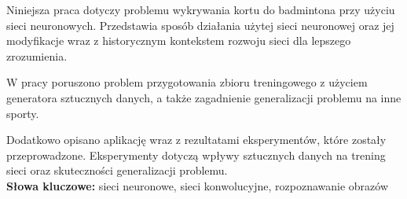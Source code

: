 Niniejsza praca dotyczy problemu wykrywania kortu do badmintona przy użyciu sieci neuronowych. Przedstawia sposób działania użytej sieci neuronowej oraz jej modyfikacje wraz z historycznym kontekstem rozwoju sieci dla lepszego zrozumienia. 

W pracy poruszono problem przygotowania zbioru treningowego z użyciem generatora sztucznych danych, a także zagadnienie generalizacji problemu na inne sporty.

Dodatkowo opisano aplikację wraz z rezultatami eksperymentów, które zostały przeprowadzone. Eksperymenty dotyczą wpływy sztucznych danych na trening sieci oraz skuteczności generalizacji problemu. \\

\noindent \textbf{Słowa kluczowe:} sieci neuronowe, sieci konwolucyjne, rozpoznawanie obrazów
